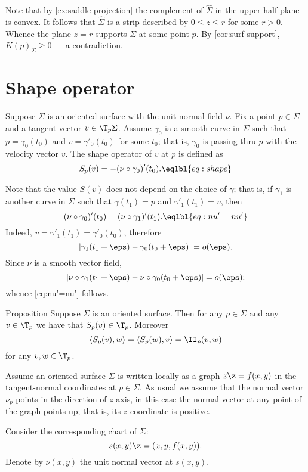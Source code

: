 Note that by \ref{ex:saddle-projection} the complement of $\hat\Sigma$ in the upper half-plane is convex.
It follows that $\hat\Sigma$ is a strip described by $0\le z\le r$ for some $r>0$.
Whence the plane $z=r$ supports $\Sigma$ at some point $p$. 
By \ref{cor:surf-support}, $K(p)_\Sigma\ge0$ --- a contradiction.
\qeds









\section*{Shape operator}

Suppose $\Sigma$ is an oriented surface with the unit normal field $\nu$.
Fix a point $p\in \Sigma$ and a tangent vector $v\in \T_p\Sigma$.
Assume $\gamma_0$ ia a smooth curve in $\Sigma$ such that $p=\gamma_0(t_0)$ and $v=\gamma'_0(t_0)$ for some $t_0$;
that is, $\gamma_0$ is passing thru $p$ with the velocity vector $v$.
The shape operator of $v$ at $p$ is defined as 
\[S_p(v)=-(\nu\circ\gamma_0)'(t_0).\eqlbl{eq:shape}\]

Note that the value $S(v)$ does not depend on the choice of $\gamma$;
that is, if $\gamma_1$ is another curve in $\Sigma$ such that $\gamma(t_1)=p$ and $\gamma'_1(t_1)=v$,
then 
\[(\nu\circ\gamma_0)'(t_0)=(\nu\circ\gamma_1)'(t_1).\eqlbl{eq:nu'=nu'}\]
Indeed, $v=\gamma'_1(t_1)=\gamma'_0(t_0)$, therefore 
\[|\gamma_1(t_1+\eps)-\gamma_0(t_0+\eps)|=o(\eps).\]
Since $\nu$ is a smooth vector field,
\[|\nu\circ\gamma_1(t_1+\eps)-\nu\circ\gamma_0(t_0+\eps)|=o(\eps);\]
whence \ref{eq:nu'=nu'} follows.


\begin{thm}{Proposition}
Suppose $\Sigma$ is an oriented surface.
Then for any $p\in \Sigma$ and any $v\in \T_p$ we have that $S_p(v)\in\T_p$.
Moreover 
\[\langle S_p(v),w\rangle=\langle S_p(w),v\rangle=\II_p(v,w)\]
for any $v,w\in \T_p$.
\end{thm}

Assume an oriented surface $\Sigma$ is written locally as a graph $z\z=f(x,y)$ in the tangent-normal coordinates at $p\in\Sigma$.
As usual we assume that the normal vector $\nu_p$ points in the direction of $z$-axis,
in this case the normal vector at any point of the graph points up; that is, its $z$-coordinate  is positive.

Consider the corresponding chart  of $\Sigma$:
\[s(x,y)\z=(x,y,f(x,y)).\]
Denote by $\nu(x,y)$ the unit normal vector at $s(x,y)$.

